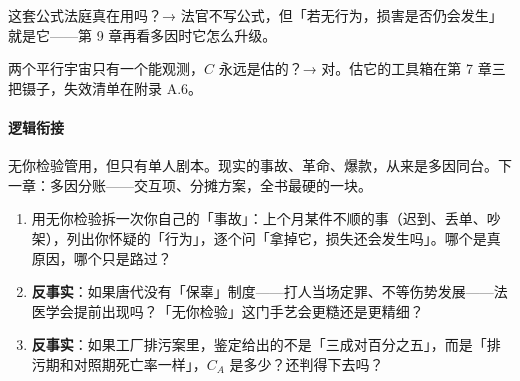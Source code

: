 \documentclass[../../main2.tex]{subfiles}
\begin{document}

\begin{reader_anticipation}
	\item 这套公式法庭真在用吗？→ 法官不写公式，但「若无行为，损害是否仍会发生」就是它——第 9 章再看多因时它怎么升级。
	\item 两个平行宇宙只有一个能观测，$C$ 永远是估的？→ 对。估它的工具箱在第 7 章三把镊子，失效清单在附录 A.6。
\end{reader_anticipation}

\paragraph*{逻辑衔接}
	无你检验管用，但只有单人剧本。现实的事故、革命、爆款，从来是多因同台。下一章：多因分账——交互项、分摊方案，全书最硬的一块。

\begin{thinkbox}
\begin{enumerate}
	\item 用无你检验拆一次你自己的「事故」：上个月某件不顺的事（迟到、丢单、吵架），列出你怀疑的「行为」，逐个问「拿掉它，损失还会发生吗」。哪个是真原因，哪个只是路过？
	\item \textbf{反事实}：如果唐代没有「保辜」制度——打人当场定罪、不等伤势发展——法医学会提前出现吗？「无你检验」这门手艺会更糙还是更精细？
	\item \textbf{反事实}：如果工厂排污案里，鉴定给出的不是「三成对百分之五」，而是「排污期和对照期死亡率一样」，$C_A$ 是多少？还判得下去吗？
\end{enumerate}
\end{thinkbox}
\end{document}

